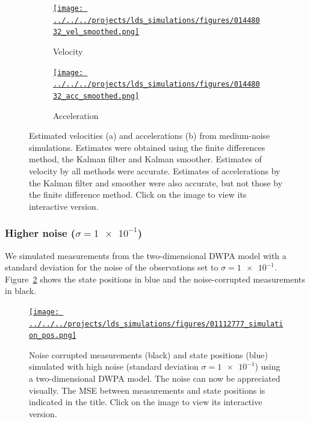 \documentclass[12pt]{article}
\begin{document}
\begin{figure}

    \begin{subfigure}{\textwidth}
        \centering
        \href{http://www.gatsby.ucl.ac.uk/~rapela/fwg/lds_repo/inference/figures/01448032_vel_smoothed.html}{\texttt{[image: ../../../projects/lds\_simulations/figures/01448032\_vel\_smoothed.png]}}
        \caption{Velocity}
    \end{subfigure}

    \begin{subfigure}{\textwidth}
        \centering
        \href{http://www.gatsby.ucl.ac.uk/~rapela/fwg/lds_repo/inference/figures/01448032_acc_smoothed.html}{\texttt{[image: ../../../projects/lds\_simulations/figures/01448032\_acc\_smoothed.png]}}
        \caption{Acceleration}
    \end{subfigure}

    \caption{Estimated velocities (a) and accelerations (b) from medium-noise
    simulations. Estimates were obtained using the finite differences method,
    the Kalman filter and Kalman smoother.  Estimates of velocity by all
    methods were accurate. Estimates of accelerations by the Kalman filter and
    smoother were also accurate, but not those by the finite difference method.
    Click on the image to view its interactive version.}

    \label{fig:vel_acc_medium_noise}

\end{figure}

\subsubsection{Higher noise ($\sigma=\num{1e-1}$)}

We simulated measurements from the two-dimensional DWPA model with a standard
deviation for the noise of the observations set to $\sigma=\num{1e-1}$.
Figure~\ref{fig:simulations_high_noise} shows the state positions in blue and
the noise-corrupted measurements in black.

\begin{figure}

    \centering
    \href{http://www.gatsby.ucl.ac.uk/~rapela/fwg/lds_repo/inference/figures/01112777_simulation_pos.html}{\texttt{[image: ../../../projects/lds\_simulations/figures/01112777\_simulation\_pos.png]}}

    \caption{Noise corrupted measurements (black) and state positions (blue)
    simulated with high noise (standard deviation $\sigma=\num{1e-1}$) using a
    two-dimensional DWPA model. The noise can now be appreciated visually.  The
    MSE between measurements and state positions is indicated in the title.
    Click on the image to view its interactive version.}

    \label{fig:simulations_high_noise}

\end{figure}
\end{document}
